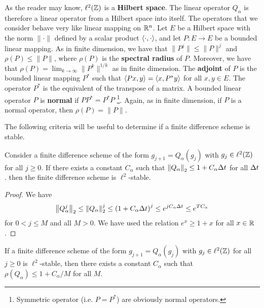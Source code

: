As the reader may know, $\ell^2(\mathbb{Z})$ is a
{\bfseries Hilbert space}.  The linear
operator $Q_\alpha$ is therefore a linear operator from a Hilbert
space into itself.  The operators that we consider behave very like
linear mapping on $\mathbb{R}^n$.   Let $E$ be a Hilbert space with the norm
$\|\cdot\|$ defined by a scalar product $\left\langle{\cdot} , {\cdot}\right\rangle$, and let
$P:E \to E$ be a bounded linear mapping.  As in finite dimension, we
have that $\displaystyle \|P^j\| \leq \|P\|^j$ and $\rho(P) \leq \|P\|$,
where $\rho(P)$ is the
{\bfseries spectral radius} of
$P$.  Moreover, we have that
$\displaystyle \rho(P) = \lim_{k\to \infty} \|P^k\|^{1/k}$ as in
finite dimension.  The
{\bfseries adjoint}
of $P$ is the bounded linear mapping
$P^\ast$ such that $\left\langle{Px} , {y}\right\rangle = \left\langle{x} , {P^\ast y}\right\rangle$ for all $x,y \in E$.
The operator $P^\ast$ is the equivalent of the transpose of a \nn
matrix.  A bounded linear operator $P$ is
{\bfseries normal}
if $P P^\ast = P^\ast P$
\footnote{Symmetric operator (i.e. $P = P^\ast$) are obviously normal
operators.}.  Again, as in finite dimension, if $P$ is a normal
operator, then $\rho(P) = \|P\|$.

The following criteria will be useful to determine if a finite
difference scheme is stable.

\begin{prop}[Lax] \label{LaxN1}
Consider a finite difference scheme of the form $g_{j+1} = Q_\alpha(g_j)$
with $g_j \in \ell^2(\mathbb{Z})$ for all $j \geq 0$.  If there exists a
constant $C_\alpha$ such that
$\displaystyle \left\|Q_\alpha \right\|_2 \leq 1 + C_\alpha \Delta{t}$ for all
$\Delta{t}$. then the finite difference scheme is $\ell^2$-stable.
\end{prop}

\begin{proof}
We have
\[
\left\|Q_\alpha^j \right\|_2 \leq \left\|Q_\alpha \right\|_2^j
\leq \left( 1 + C_\alpha \Delta{t} \right)^j
\leq  e^{j C_\alpha \Delta{t}} \leq e^{T C_\alpha}
\]
for $0 < j \leq M$ and all $M>0$.
We have used the relation $e^x \geq 1 + x$ for all $x \in \mathbb{R}$.
\end{proof}

\begin{prop} \label{vonNNo1}
If a finite difference scheme of the form $g_{j+1} = Q_\alpha(g_j)$
with $g_j \in \ell^2(\mathbb{Z})$ for all $j \geq 0$ is $\ell^2$-stable, then
there exists a constant $C_\alpha$ such that
$\rho(Q_\alpha) \leq 1 + C_\alpha/M$ for all $M$.
\end{prop}

